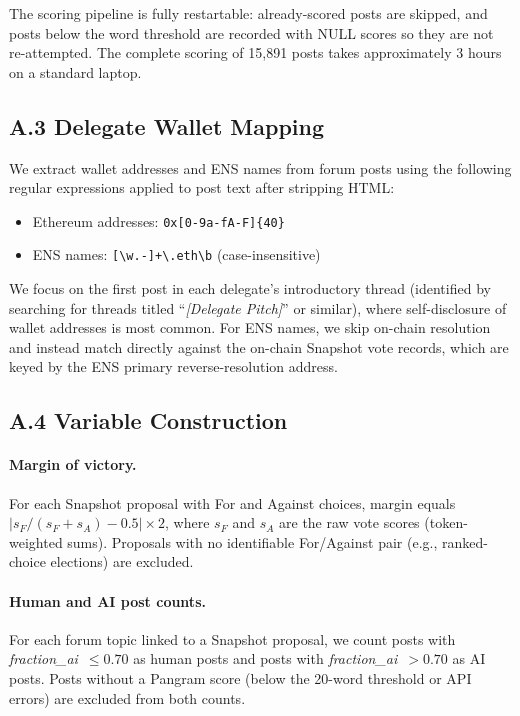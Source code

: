 \documentclass[12pt]{article}
\begin{document}
The scoring pipeline is fully restartable: already-scored posts are skipped,
and posts below the word threshold are recorded with NULL scores so they are not
re-attempted. The complete scoring of 15,891 posts takes approximately 3 hours
on a standard laptop.

\subsection*{A.3 Delegate Wallet Mapping}

We extract wallet addresses and ENS names from forum posts using the following
regular expressions applied to post text after stripping HTML:
\begin{itemize}
  \item Ethereum addresses: \texttt{0x[0-9a-fA-F]\{40\}}
  \item ENS names: \texttt{[\textbackslash w.-]+\textbackslash .eth\textbackslash b} (case-insensitive)
\end{itemize}

We focus on the first post in each delegate's introductory thread (identified by
searching for threads titled ``\textit{[Delegate Pitch]}'' or similar), where
self-disclosure of wallet addresses is most common. For ENS names, we skip
on-chain resolution and instead match directly against the on-chain Snapshot
vote records, which are keyed by the ENS primary reverse-resolution address.

\subsection*{A.4 Variable Construction}

\paragraph{Margin of victory.}
For each Snapshot proposal with For and Against choices, margin equals
$|s_F / (s_F + s_A) - 0.5| \times 2$, where $s_F$ and $s_A$ are the raw vote
scores (token-weighted sums). Proposals with no identifiable For/Against pair
(e.g., ranked-choice elections) are excluded.

\paragraph{Human and AI post counts.}
For each forum topic linked to a Snapshot proposal, we count posts with
\textit{fraction\_ai}~$\leq 0.70$ as human posts and posts with
\textit{fraction\_ai}~$> 0.70$ as AI posts. Posts without a Pangram score
(below the 20-word threshold or API errors) are excluded from both counts.
\end{document}

